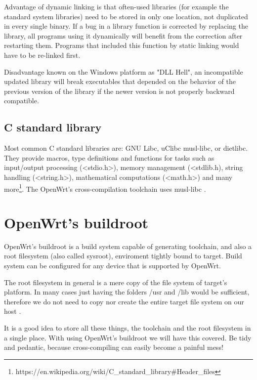 Advantage of dynamic linking is that often-used libraries (for example the standard system libraries) need to be stored in only one location, not duplicated in every single binary.
If a bug in a library function is corrected by replacing the library, all programs using it dynamically will benefit from the correction after restarting them.
Programs that included this function by static linking would have to be re-linked first.

Disadvantage known on the Windows platform as "DLL Hell", an incompatible updated library will break executables that depended on the behavior of the previous version of the library if the newer version is not properly backward compatible\cite{compiler}.



\subsection{C standard library}

Most common C standard libraries are: GNU Libc, uClibc musl-libc, or dietlibc.
They provide macros, type definitions and functions for tasks such as input/output processing (<stdio.h>), memory management (<stdlib.h), string handling (<string.h>), mathematical computations (<math.h>) and many more\footnote{https://en.wikipedia.org/wiki/C\_standard\_library\#Header\_files}.
The OpenWrt's cross-compilation toolchain uses musl-libc \cite{c_library}.



\section{OpenWrt's buildroot}

OpenWrt's buildroot is a build system capable of generating toolchain, and also a root filesystem (also called sysroot), enviroment tightly bound to target.
Build system can be configured for any device that is supported by OpenWrt.

The root filesystem in general is a mere copy of the file system of target's platform.
In many cases just having the folders /usr and /lib would be sufficient, therefore we do not need to copy nor create the entire target file system on our host .

It is a good idea to store all these things, the toolchain and the root filesystem in a single place.
With using OpenWrt's buildroot we will have this covered.
Be tidy and pedantic, because cross-compiling can easily become a painful mess!



